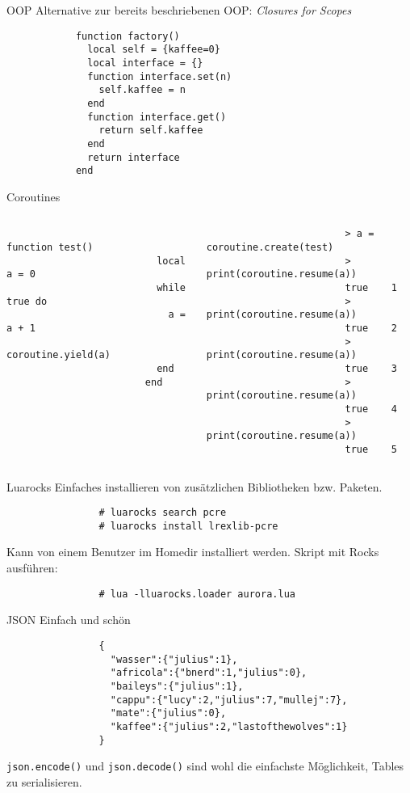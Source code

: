 \documentclass{beamer}
\begin{document}
		\begin{frame}[fragile]{OOP}
			\lstset{numbers=left}
			Alternative zur bereits beschriebenen OOP: \textit{Closures for Scopes}
			\begin{lstlisting}
			function factory()
			  local self = {kaffee=0}
			  local interface = {}
			  function interface.set(n)
			    self.kaffee = n
			  end
			  function interface.get()
			    return self.kaffee
			  end
			  return interface
			end
			\end{lstlisting}
		\end{frame}

		\begin{frame}[fragile]{Coroutines}
			\begin{columns}
					\begin{lstlisting}
						function test()
						  local a = 0
						  while true do
						    a = a + 1
						    coroutine.yield(a)
						  end
						end
					\end{lstlisting}
					\begin{lstlisting}
						> a = coroutine.create(test)
						> print(coroutine.resume(a))
						true	1
						> print(coroutine.resume(a))
						true	2
						> print(coroutine.resume(a))
						true	3
						> print(coroutine.resume(a))
						true	4
						> print(coroutine.resume(a))
						true	5
					\end{lstlisting}
			\end{columns}
		\end{frame}
		
		\begin{frame}[fragile]{Luarocks}
			\lstset{numbers=none}
			Einfaches installieren von zusätzlichen Bibliotheken bzw. Paketen.
			\begin{lstlisting}
				# luarocks search pcre
				# luarocks install lrexlib-pcre
			\end{lstlisting}
			\vskip15pt
			Kann von einem Benutzer im Homedir installiert werden.
			\vskip15pt
			Skript mit Rocks ausführen:

			\begin{lstlisting}
				# lua -lluarocks.loader aurora.lua
			\end{lstlisting}
		\end{frame}
		
		\begin{frame}[fragile]{JSON}
			Einfach und schön

			\begin{lstlisting}
				{
				  "wasser":{"julius":1},
				  "africola":{"bnerd":1,"julius":0},
				  "baileys":{"julius":1},
				  "cappu":{"lucy":2,"julius":7,"mullej":7},
				  "mate":{"julius":0},
				  "kaffee":{"julius":2,"lastofthewolves":1}
				}
			\end{lstlisting}
			\verb+json.encode()+ und \verb+json.decode()+ sind wohl die einfachste Möglichkeit, Tables zu serialisieren.
		\end{frame}
		
\end{document}
